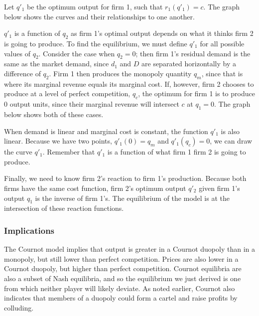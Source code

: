 \documentclass[letterpaper,10pt,english]{jupyterBook}
\begin{document}
\sphinxAtStartPar
Let \(q'_1\) be the optimum output for firm 1, such that \(r_1(q'_1) = c\). The graph below shows the curves and their relationships to one another.

\noindent{}

\sphinxAtStartPar
\(q'_1\) is a function of \(q_2\) as firm 1’s optimal output depends on what it thinks firm 2 is going to produce. To find the equilibrium, we must define \(q'_1\) for all possible values of \(q_2\). Consider the case when \(q_2=0\); then firm 1’s residual demand is the same as the market demand, since \(d_1\) and \(D\) are separated horizontally by a difference of \(q_2\). Firm 1 then produces the monopoly quantity \(q_m\), since that is where its marginal revenue equals its marginal cost. If, however, firm 2 chooses to produce at a level of perfect competition, \(q_c\), the optimum for firm 1 is to produce 0 output units, since their marginal revenue will intersect \(c\) at \(q_1 = 0\). The graph below shows both of these cases.

\noindent{}

\sphinxAtStartPar
When demand is linear and marginal cost is constant, the function \(q'_1\) is also linear. Because we have two points, \(q'_1(0) = q_m\) and \(q'_1(q_c) = 0\), we can draw the curve \(q'_1\). Remember that \(q'_1\) is a function of what firm 1  firm 2 is going to produce.

\noindent{}

\sphinxAtStartPar
Finally, we need to know firm 2’s reaction to firm 1’s production. Because both firms have the same cost function, firm 2’s optimum output \(q'_2\) given firm 1’s output \(q_1\) is the inverse of firm 1’s. The equilibrium of the model is at the intersection of these reaction functions.

\noindent{}


\subsubsection{Implications}
\label{\detokenize{content/07-game-theory/cournot:implications}}
\sphinxAtStartPar
The Cournot model implies that output is greater in a Cournot duopoly than in a monopoly, but still lower than perfect competition. Prices are also lower in a Cournot duopoly, but higher than perfect competition. Cournot equilibria are also a subset of Nash equilibria, and so the equilibrium we just derived is one from which neither player will likely deviate. As noted earlier, Cournot also indicates that members of a duopoly could form a cartel and raise profits by colluding.
\end{document}
